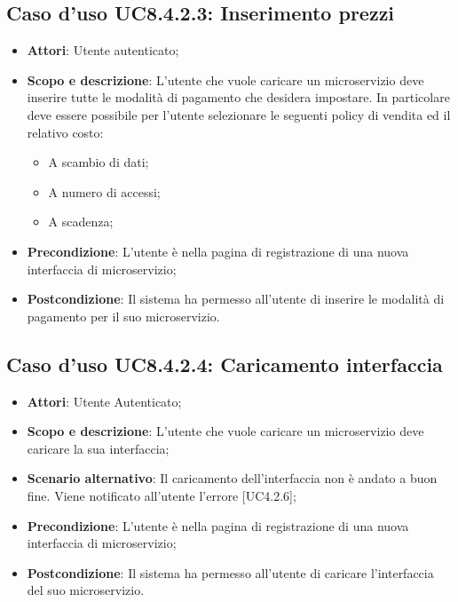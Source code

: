 \documentclass[12pt,a4paper,titlepage]{article}
\begin{document}
	\subsection{Caso d'uso UC8.4.2.3: Inserimento prezzi}
	\label{UC8.4.2.3}
	\begin{itemize}
		\item \textbf{Attori}: Utente autenticato;
		\item \textbf{Scopo e descrizione}: L'utente che vuole caricare un microservizio deve inserire tutte le modalità di pagamento che desidera impostare. In particolare deve essere possibile per l'utente selezionare le seguenti policy di vendita ed il relativo costo:
		\begin{itemize}
			\item A scambio di dati;
			\item A numero di accessi;
			\item A scadenza;
		\end{itemize} 
		\item \textbf{Precondizione}: L'utente è nella pagina di registrazione di una nuova interfaccia di microservizio;
		\item \textbf{Postcondizione}: Il sistema ha permesso all'utente di inserire le modalità di pagamento per il suo microservizio.
	\end{itemize}
	\subsection{Caso d'uso UC8.4.2.4: Caricamento interfaccia}
	\label{UC8.4.2.4}
	\begin{itemize}
		\item \textbf{Attori}: Utente Autenticato;
		\item \textbf{Scopo e descrizione}: L'utente che vuole caricare un microservizio deve caricare la sua interfaccia;
		\item \textbf{Scenario alternativo}: Il caricamento dell'interfaccia non è andato a buon fine. Viene notificato all'utente l'errore [UC4.2.6];
		\item \textbf{Precondizione}: L'utente è nella pagina di registrazione di una nuova interfaccia di microservizio;
		\item \textbf{Postcondizione}: Il sistema ha permesso all'utente di caricare l'interfaccia del suo microservizio.
	\end{itemize}
\end{document}
